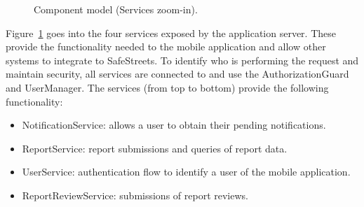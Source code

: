 \begin{figure}[H]
    \centering
    \caption{\label{fig:component-services-zoom}Component model (Services zoom-in).}
\end{figure}

Figure~\ref{fig:component-services-zoom} goes into the four services exposed by the application server. These provide the functionality needed to the mobile application and allow other systems to integrate to SafeStreets.
To identify who is performing the request and maintain security, all services are connected to and use the AuthorizationGuard and UserManager.
The services (from top to bottom) provide the following functionality:
\begin{itemize}
    \item NotificationService: allows a user to obtain their pending notifications.
    \item ReportService: report submissions and queries of report data.
    \item UserService: authentication flow to identify a user of the mobile application.
    \item ReportReviewService: submissions of report reviews.
\end{itemize}


